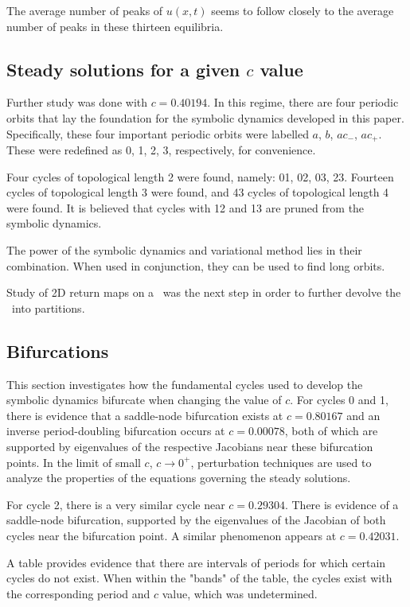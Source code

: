 The average number of peaks of $u(x, t)$ seems to follow closely to the average number of peaks in these thirteen equilibria.

\subsection{Steady solutions for a given $c$ value}
\label{sect:MNGsteadyFIXc}


Further study was done with $c=0.40194$. In this regime,
there are four periodic orbits that lay the foundation for
the symbolic dynamics developed in this paper. Specifically, these four important periodic orbits were labelled $a$, $b$, $ac_-$, $ac_+$. These were redefined as 0, 1, 2, 3, respectively, for convenience.

Four cycles of topological length 2 were found, namely: 01, 02, 03, 23. Fourteen cycles of topological length 3 were found, and 43 cycles of topological length 4 were found. It is believed that cycles with 12 and 13 are pruned from the symbolic dynamics.

The power of the symbolic dynamics and variational method lies in their combination. When used in conjunction, they can be used to find long orbits.

Study of 2D return maps on a \PoincSec\ was the next step in order to further devolve the \statesp\ into partitions.

\subsection{Bifurcations}
\label{sect:MNGbifur}


This section investigates how the fundamental cycles used to develop the symbolic dynamics bifurcate when changing the value of $c$. For cycles 0 and 1, there is evidence that a saddle-node bifurcation exists at $c=0.80167$ and an inverse period-doubling bifurcation occurs at $c=0.00078$, both of which are supported by eigenvalues of the respective Jacobians near these bifurcation points. In the limit of small $c$, $c\rightarrow 0^+$, perturbation techniques are used to analyze the properties of the equations governing the steady solutions.

For cycle 2, there is a very similar cycle near $c=0.29304$. There is evidence of a saddle-node bifurcation, supported by the eigenvalues of the Jacobian of both cycles near the bifurcation point. A similar phenomenon appears at $c = 0.42031$.

A table provides evidence that there are intervals of periods for which certain cycles do not exist. When within the "bands" of the table, the cycles exist with the corresponding period and $c$ value, which was undetermined.

